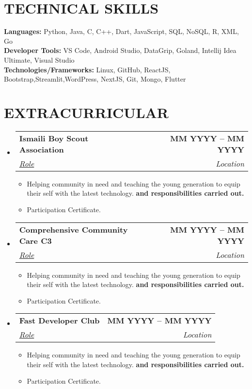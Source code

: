 \documentclass[letterpaper,11pt]{article}
\makeatletter
\newcommand{\resumeItem}[1]{
  \item\small{
    {#1 \vspace{-2pt}}
  }
}
\newcommand{\resumeSubheading}[4]{
  \vspace{-2pt}\item
    \begin{tabular*}{1.0\textwidth}[t]{l@{\extracolsep{\fill}}r}
      \textbf{\large#1} & \textbf{\small #2} \\
      \textit{\large#3} & \textit{\small #4} \\
     
    \end{tabular*}\vspace{-7pt}
}
\newcommand{\resumeSubHeadingListStart}{\begin{itemize}[leftmargin=0.0in, label={}]}
\newcommand{\resumeSubHeadingListEnd}{\end{itemize}}
\newcommand{\resumeItemListStart}{\begin{itemize}}
\newcommand{\resumeItemListEnd}{\end{itemize}\vspace{-5pt}}
\makeatother
\begin{document}
\section{TECHNICAL SKILLS}
 \begin{itemize}[leftmargin=0.15in, label={}]
    \small{\item{
     \textbf{\normalsize{Languages:}}{ \normalsize{Python, Java, C, C++, Dart, JavaScript, SQL, NoSQL, R, XML, Go}} \\
     \textbf{\normalsize{Developer Tools:}}{ \normalsize{VS Code, Android Studio, DataGrip, Goland, Intellij Idea Ultimate, Visual Studio}} \\
     \textbf{\normalsize{Technologies/Frameworks:}}{\normalsize{ Linux, GitHub, ReactJS, Bootstrap,Streamlit,WordPress, NextJS, Git, Mongo, Flutter}} \\
    }}
 \end{itemize}
 \vspace{-15pt}




\section{EXTRACURRICULAR}
    \resumeSubHeadingListStart
        \resumeSubheading{Ismaili Boy Scout Association \href{Certificate Proof link}{\raisebox{-0.1\height}\faExternalLink } }{MM YYYY -- MM YYYY}{\underline{Role}}{Location}
            \resumeItemListStart
                \resumeItem{\normalsize{Helping community in need and teaching the young generation to equip their self with the latest technology. \textbf{and responsibilities carried out.}}}
                \resumeItem{\normalsize{Participation Certificate. \href{ParticipationCertificateLink.com}{\raisebox{-0.1\height}\faExternalLink }}}
            \resumeItemListEnd

            \resumeSubheading{Comprehensive Community Care C3 \href{Certificate Proof link}{\raisebox{-0.1\height}\faExternalLink } }{MM YYYY -- MM YYYY}{\underline{Role}}{Location}
            \resumeItemListStart
                \resumeItem{\normalsize{Helping community in need and teaching the young generation to equip their self with the latest technology. \textbf{and responsibilities carried out.}}}
                \resumeItem{\normalsize{Participation Certificate. \href{ParticipationCertificateLink.com}{\raisebox{-0.1\height}\faExternalLink }}}
            \resumeItemListEnd

            \resumeSubheading{Fast Developer Club\href{Certificate Proof link}{\raisebox{-0.1\height}\faExternalLink } }{MM YYYY -- MM YYYY}{\underline{Role}}{Location}
            \resumeItemListStart
                \resumeItem{\normalsize{Helping community in need and teaching the young generation to equip their self with the latest technology. \textbf{and responsibilities carried out.}}}
                \resumeItem{\normalsize{Participation Certificate. \href{ParticipationCertificateLink.com}{\raisebox{-0.1\height}\faExternalLink }}}
            \resumeItemListEnd
            
    \resumeSubHeadingListEnd
 \vspace{-11pt} 
\end{document}
